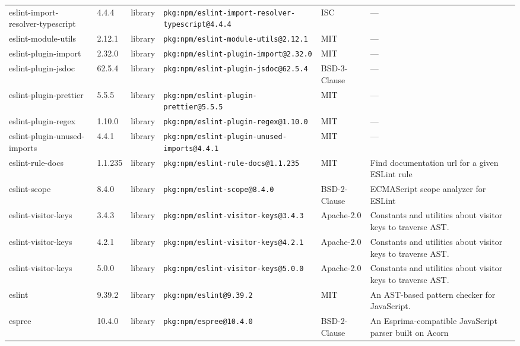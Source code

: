 \documentclass[11pt,a4paper]{article}
\begin{document}
\begin{longtable}{|p{4cm}|p{2cm}|p{1.6cm}|p{5cm}|p{1.5cm}|p{3.5cm}|}
\raggedright eslint-import-resolver-typescript & 4.4.4 & library & \small\texttt{pkg:npm/eslint-import-resolver-typescript@4.4.4} & ISC & \small — \\
\raggedright eslint-module-utils & 2.12.1 & library & \small\texttt{pkg:npm/eslint-module-utils@2.12.1} & MIT & \small — \\
\raggedright eslint-plugin-import & 2.32.0 & library & \small\texttt{pkg:npm/eslint-plugin-import@2.32.0} & MIT & \small — \\
\raggedright eslint-plugin-jsdoc & 62.5.4 & library & \small\texttt{pkg:npm/eslint-plugin-jsdoc@62.5.4} & BSD-3-Clause & \small — \\
\raggedright eslint-plugin-prettier & 5.5.5 & library & \small\texttt{pkg:npm/eslint-plugin-prettier@5.5.5} & MIT & \small — \\
\raggedright eslint-plugin-regex & 1.10.0 & library & \small\texttt{pkg:npm/eslint-plugin-regex@1.10.0} & MIT & \small — \\
\raggedright eslint-plugin-unused-imports & 4.4.1 & library & \small\texttt{pkg:npm/eslint-plugin-unused-imports@4.4.1} & MIT & \small — \\
\raggedright eslint-rule-docs & 1.1.235 & library & \small\texttt{pkg:npm/eslint-rule-docs@1.1.235} & MIT & \small Find documentation url for a given ESLint rule \\
\raggedright eslint-scope & 8.4.0 & library & \small\texttt{pkg:npm/eslint-scope@8.4.0} & BSD-2-Clause & \small ECMAScript scope analyzer for ESLint \\
\raggedright eslint-visitor-keys & 3.4.3 & library & \small\texttt{pkg:npm/eslint-visitor-keys@3.4.3} & Apache-2.0 & \small Constants and utilities about visitor keys to traverse AST. \\
\raggedright eslint-visitor-keys & 4.2.1 & library & \small\texttt{pkg:npm/eslint-visitor-keys@4.2.1} & Apache-2.0 & \small Constants and utilities about visitor keys to traverse AST. \\
\raggedright eslint-visitor-keys & 5.0.0 & library & \small\texttt{pkg:npm/eslint-visitor-keys@5.0.0} & Apache-2.0 & \small Constants and utilities about visitor keys to traverse AST. \\
\raggedright eslint & 9.39.2 & library & \small\texttt{pkg:npm/eslint@9.39.2} & MIT & \small An AST-based pattern checker for JavaScript. \\
\raggedright espree & 10.4.0 & library & \small\texttt{pkg:npm/espree@10.4.0} & BSD-2-Clause & \small An Esprima-compatible JavaScript parser built on Acorn \\

\end{longtable}
\end{document}
